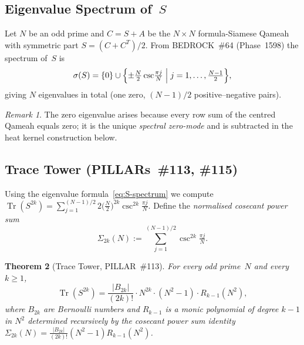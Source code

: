 \documentclass[aps,prd,twocolumn,superscriptaddress,floatfix,nofootinbib]{revtex4-2}
\newtheorem{theorem}{Theorem}
\theoremstyle{definition}
\theoremstyle{remark}
\newtheorem{remark}[theorem]{Remark}
\begin{document}
\subsection{Eigenvalue Spectrum of~$S$}
\label{sec:S-spectrum}

Let $N$ be an odd prime and $C = S + A$ be the $N{\times}N$ formula-Siamese Qameah
with symmetric part $S = (C+C^T)/2$.  From BEDROCK~\#64 (Phase~1598) the spectrum
of~$S$ is
\begin{equation}
  \sigma(S)
  = \{0\}
    \cup \Bigl\{\pm \tfrac{N}{2}\csc\!\tfrac{\pi j}{N}
                \;\Big|\; j = 1,\ldots,\tfrac{N-1}{2}\Bigr\},
  \label{eq:S-spectrum}
\end{equation}
giving $N$ eigenvalues in total (one zero, $(N-1)/2$ positive--negative pairs).

\begin{remark}
The zero eigenvalue arises because every row sum of the centred Qameah equals zero;
it is the unique \emph{spectral zero-mode} and is subtracted in the heat kernel
construction below.
\end{remark}

\subsection{Trace Tower (PILLARs~\#113, \#115)}
\label{sec:trace-tower}

Using the eigenvalue formula~\eqref{eq:S-spectrum} we compute
$\operatorname{Tr}(S^{2k}) = \sum_{j=1}^{(N-1)/2} 2\bigl(\tfrac{N}{2}\bigr)^{2k}
\csc^{2k}\!\tfrac{\pi j}{N}$.
Define the \emph{normalised cosecant power sum}
\begin{equation}
  \Sigma_{2k}(N) := \sum_{j=1}^{(N-1)/2} \csc^{2k}\!\tfrac{\pi j}{N}.
  \label{eq:csc-sum}
\end{equation}

\begin{theorem}[Trace Tower, PILLAR~\#113]
\label{thm:trace-tower}
For every odd prime~$N$ and every $k \ge 1$,
\begin{equation}
  \operatorname{Tr}(S^{2k})
  = \frac{|B_{2k}|}{(2k)!}\cdot N^{2k}\cdot (N^2-1)\cdot R_{k-1}(N^2),
  \label{eq:trace-tower}
\end{equation}
where $B_{2k}$ are Bernoulli numbers and $R_{k-1}$ is a monic polynomial of
degree $k-1$ in $N^2$ determined recursively by the cosecant power sum
identity $\Sigma_{2k}(N) = \tfrac{|B_{2k}|}{(2k)!}(N^2-1)R_{k-1}(N^2)$.
\end{theorem}
\end{document}

